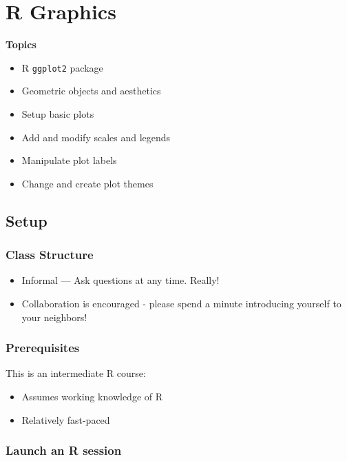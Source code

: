 \documentclass[]{book}
\providecommand{\tightlist}{%
  \setlength{\itemsep}{0pt}\setlength{\parskip}{0pt}}
\begin{document}
\hypertarget{r-graphics}{%
\chapter{R Graphics}\label{r-graphics}}

\textbf{Topics}

\begin{itemize}
\tightlist
\item
  R \texttt{ggplot2} package
\item
  Geometric objects and aesthetics
\item
  Setup basic plots
\item
  Add and modify scales and legends
\item
  Manipulate plot labels
\item
  Change and create plot themes
\end{itemize}

\hypertarget{setup-2}{%
\section{Setup}\label{setup-2}}

\hypertarget{class-structure-2}{%
\subsection{Class Structure}\label{class-structure-2}}

\begin{itemize}
\tightlist
\item
  Informal --- Ask questions at any time. Really!
\item
  Collaboration is encouraged - please spend a minute introducing yourself to your neighbors!
\end{itemize}

\hypertarget{prerequisites-2}{%
\subsection{Prerequisites}\label{prerequisites-2}}

This is an intermediate R course:

\begin{itemize}
\tightlist
\item
  Assumes working knowledge of R
\item
  Relatively fast-paced
\end{itemize}

\hypertarget{launch-an-r-session-3}{%
\subsection{Launch an R session}\label{launch-an-r-session-3}}
\end{document}
